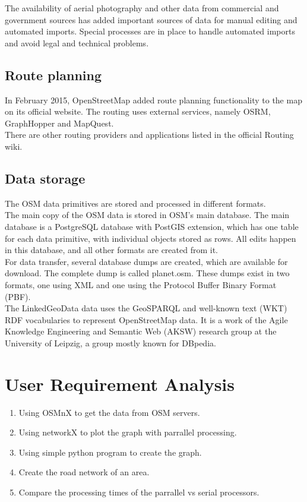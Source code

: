 The availability of aerial photography and other data from commercial and government sources has added important sources of data for manual editing and automated imports. Special processes are in place to handle automated imports and avoid legal and technical problems.
\subsection{ Route planning}

In February 2015, OpenStreetMap added route planning functionality to the map on its official website. The routing uses external services, namely OSRM, GraphHopper and MapQuest.\\

There are other routing providers and applications listed in the official Routing wiki.

\subsection{Data storage}
The OSM data primitives are stored and processed in different formats.\\

The main copy of the OSM data is stored in OSM's main database. The main database is a PostgreSQL database with PostGIS extension, which has one table for each data primitive, with individual objects stored as rows. All edits happen in this database, and all other formats are created from it.\\

For data transfer, several database dumps are created, which are available for download. The complete dump is called planet.osm. These dumps exist in two formats, one using XML and one using the Protocol Buffer Binary Format (PBF).\\

The LinkedGeoData data uses the GeoSPARQL and well-known text (WKT) RDF vocabularies to represent OpenStreetMap data. It is a work of the Agile Knowledge Engineering and Semantic Web (AKSW) research group at the University of Leipzig, a group mostly known for DBpedia.

\section{User Requirement Analysis}
\begin{enumerate}
	\item Using OSMnX to get the data from OSM servers.
	\item Using networkX to plot the graph with parrallel processing.
	\item Using simple python program to create the graph. 
	\item Create the road network of an area.
	\item Compare the processing times of the parrallel vs serial processors. 
\end{enumerate}